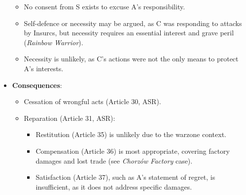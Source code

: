 \begin{itemize}
\begin{itemize}
        \item No consent from S exists to excuse A’s responsibility.
        \item Self-defence or necessity may be argued, as C was responding to attacks by Insurcs, but necessity requires an essential interest and grave peril (\textit{Rainbow Warrior}).
        \item Necessity is unlikely, as C’s actions were not the only means to protect A’s interests.
    \end{itemize}
    \item \textbf{Consequences}:
    \begin{itemize}
        \item Cessation of wrongful acts (Article 30, ASR).
        \item Reparation (Article 31, ASR):
        \begin{itemize}
            \item Restitution (Article 35) is unlikely due to the warzone context.
            \item Compensation (Article 36) is most appropriate, covering factory damages and lost trade (see \textit{Chorzów Factory} case).
            \item Satisfaction (Article 37), such as A’s statement of regret, is insufficient, as it does not address specific damages.
        \end{itemize}
    \end{itemize}
\end{itemize}

